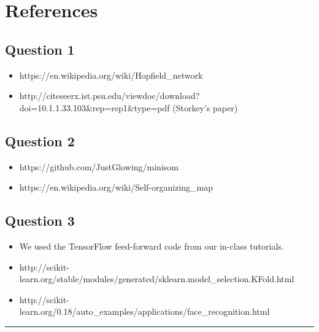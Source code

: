 \documentclass[11pt]{article}
\providecommand{\tightlist}{%
  \setlength{\itemsep}{0pt}\setlength{\parskip}{0pt}}
\begin{document}
    \section{References}\label{references}

\subsection{Question 1}\label{question-1}

\begin{itemize}
\tightlist
\item
  https://en.wikipedia.org/wiki/Hopfield\_network
\item
  http://citeseerx.ist.psu.edu/viewdoc/download?doi=10.1.1.33.103\&rep=rep1\&type=pdf
  (Storkey's paper)
\end{itemize}

\subsection{Question 2}\label{question-2}

\begin{itemize}
\tightlist
\item
  https://github.com/JustGlowing/minisom
\item
  https://en.wikipedia.org/wiki/Self-organizing\_map
\end{itemize}

\subsection{Question 3}\label{question-3}

\begin{itemize}
\tightlist
\item
  We used the TensorFlow feed-forward code from our in-class tutorials.
\item
  http://scikit-learn.org/stable/modules/generated/sklearn.model\_selection.KFold.html
\item
  http://scikit-learn.org/0.18/auto\_examples/applications/face\_recognition.html
\end{itemize}

    \begin{center}\rule{0.5\linewidth}{\linethickness}\end{center}


    
    
    
    
\end{document}
